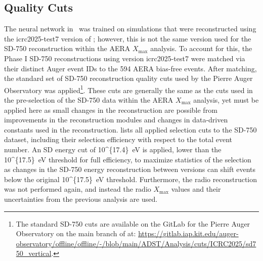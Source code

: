 
\subsection{Quality Cuts}\label{ssec:cuts}


The neural network in~ was trained on simulations that were reconstructed using the icrc2025-test7 version of \Offline; however, this is not the same \Offline version used for the SD-750 reconstruction within the AERA $X_{\text{max}}$ analysis.
To account for this, the Phase I SD-750 reconstructions using \Offline version icrc2025-test7 were matched via their distinct Auger event IDs to the 594 AERA bias-free events.
After matching, the standard set of SD-750 reconstruction quality cuts used by the Pierre Auger Observatory was applied\footnote[1]{The standard SD-750 cuts are available on the GitLab for the Pierre Auger Observatory on the main branch of \Offline at: \href{https://gitlab.iap.kit.edu/auger-observatory/offline/offline/-/blob/main/ADST/Analysis/cuts/ICRC2025/sd750_vertical.cuts?ref_type=heads}{https://gitlab.iap.kit.edu/auger-observatory/offline/offline/-/blob/main/ADST/Analysis/cuts/ICRC2025/sd750\_vertical}.}.
These cuts are generally the same as the cuts used in the pre-selection of the SD-750 data within the AERA $X_{\text{max}}$ analysis, yet must be applied here as small changes in the reconstruction are possible from improvements in the reconstruction modules and changes in data-driven constants used in the reconstruction.
 lists all applied selection cuts to the SD-750 dataset, including their selection efficiency with respect to the total event number.
An SD energy cut of \qty[parse-numbers=false]{10^{17.4}}{\electronvolt} is applied, lower than the \qty[parse-numbers=false]{10^{17.5}}{\electronvolt} threshold for full efficiency, to maximize statistics of the selection as changes in the SD-750 energy reconstruction between \Offline versions can shift events below the original \qty[parse-numbers=false]{10^{17.5}}{\electronvolt} threshold.
Furthermore, the radio reconstruction was not performed again, and instead the radio $X_{\text{max}}$ values and their uncertainties from the previous analysis are used.

